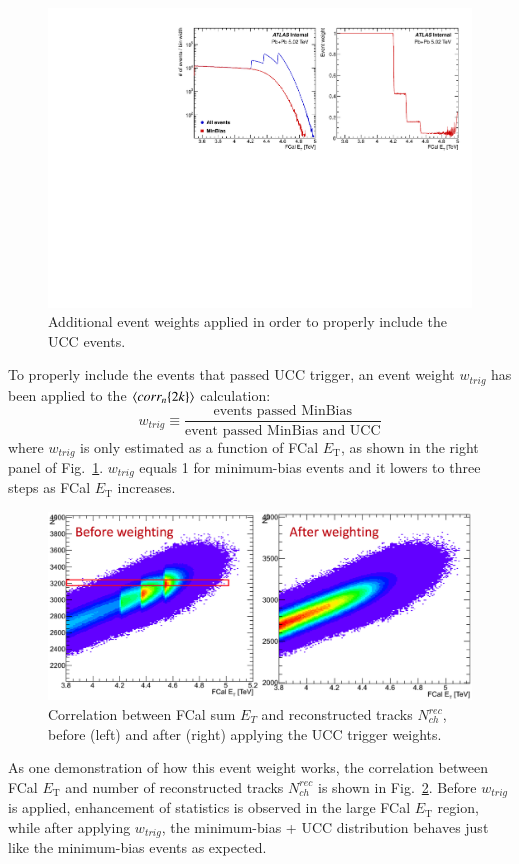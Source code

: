 \begin{figure}[H]
\centering
\includegraphics[width=.9\linewidth]{figs/sec_ana/trig_weight.pdf}
\caption{Additional event weights applied in order to properly include the UCC events.}
\label{fig:ana_evtWght}
\end{figure}

To properly include the events that passed UCC trigger, an event weight $w_{trig}$ has been applied to the $\left\langle corr_{n}\{2k\}\right\rangle$ calculation:
\begin{equation}
w_{trig}\equiv \frac{\text{events passed MinBias}}{\text{event passed MinBias and UCC}}
\end{equation}
where $w_{trig}$ is only estimated as a function of FCal $E_\text{T}$, as shown in the right panel of Fig.~\ref{fig:ana_evtWght}. $w_{trig}$ equals 1 for minimum-bias events and it lowers to three steps as FCal $E_\text{T}$ increases.

\begin{figure}[H]
\centering
\includegraphics[width=.9\linewidth]{figs/sec_ana/evtWeight_comp.png}
\caption{Correlation between FCal sum $E_T$ and reconstructed tracks $N_{ch}^{rec}$, before (left) and after (right) applying the UCC trigger weights.}
\label{fig:ana_evtWght_comp}
\end{figure}
As one demonstration of how this event weight works, the correlation between FCal $E_\text{T}$ and number of reconstructed tracks $N_{ch}^{rec}$ is shown in Fig.~\ref{fig:ana_evtWght_comp}. Before $w_{trig}$ is applied, enhancement of statistics is observed in the large FCal $E_\text{T}$ region, while after applying $w_{trig}$, the minimum-bias + UCC distribution behaves just like the minimum-bias events as expected.



